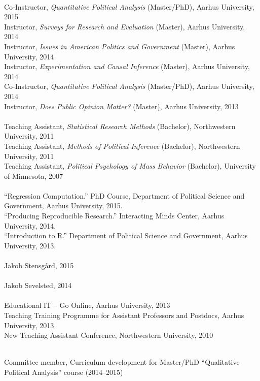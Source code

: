 \documentclass[12pt]{article}
\renewcommand{\section}[1]{\pagebreak[3]%
    \llap{\scshape\smash{\parbox[t]{\marginparwidth}{\raggedright {\color{lg}#1}}}}%
    \vspace{-\baselineskip}\par}
\newcommand{\topic}[1]{\pagebreak[3]\indent {\color{lg}{\footnotesize #1 }}\\}
\newcommand{\entry}[1]{\indent {\color{lg}\guillemotright}\hspace{2pt}#1\vspace{.25em}\\}
\begin{document}
\section{Teaching and Advising}
\topic{Experience: Aarhus University}
\entry{Co-Instructor, {\em Quantitative Political Analysis} (Master/PhD), Aarhus University, 2015}
\entry{Instructor, {\em Surveys for Research and Evaluation} (Master), Aarhus University, 2014}
\entry{Instructor, {\em Issues in American Politics and Government} (Master), Aarhus University, 2014}
\entry{Instructor, {\em Experimentation and Causal Inference} (Master), Aarhus University, 2014}
\entry{Co-Instructor, {\em Quantitative Political Analysis} (Master/PhD), Aarhus University, 2014}
\entry{Instructor, {\em Does Public Opinion Matter?} (Master), Aarhus University, 2013}
\topic{Experience: Northwestern University}
\entry{Teaching Assistant, {\em Statistical Research Methods} (Bachelor), Northwestern University, 2011} %
\entry{Teaching Assistant, {\em Methods of Political Inference} (Bachelor), Northwestern University, 2011} %
\entry{Teaching Assistant, {\em Political Psychology of Mass Behavior} (Bachelor), University of Minnesota, 2007} %

\topic{Short courses}
\entry{``Regression Computation.'' PhD Course, Department of Political Science and Government, Aarhus University, 2015.}
\entry{``Producing Reproducible Research.'' Interacting Minds Center, Aarhus University, 2014.}
\entry{``Introduction to R.'' Department of Political Science and Government, Aarhus University, 2013.}

\topic{Master Advising, Aarhus University}
\entry{Jakob Stensg{\aa}rd, 2015}

\topic{Internship Supervision, Aarhus University}
\entry{Jakob Sevelsted, 2014}

\topic{Pedagogical Training}
\entry{Educational IT -- Go Online, Aarhus University, 2013}
\entry{Teaching Training Programme for Assistant Professors and Postdocs, Aarhus University, 2013}
\entry{New Teaching Assistant Conference, Northwestern University, 2010}

\section{Service}
\topic{Departmental (Aarhus University)}
\entry{Committee member, Curriculum development for Master/PhD ``Qualitative Political Analysis'' course (2014--2015)}
\end{document}
